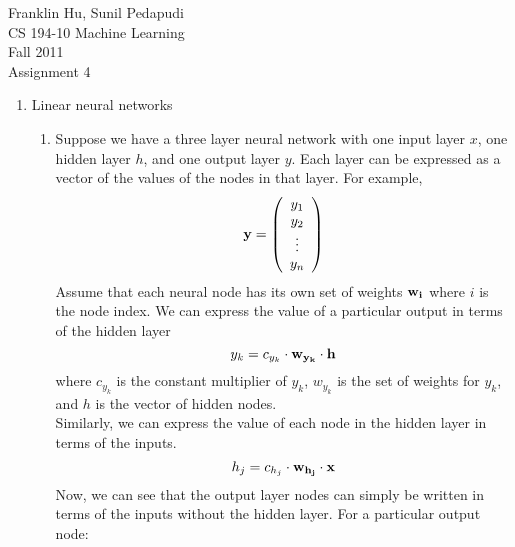 \documentclass{article}
\begin{document}
Franklin Hu, Sunil Pedapudi \\
CS 194-10 Machine Learning \\
Fall 2011 \\
Assignment 4 \\

\begin{enumerate}
    \item Linear neural networks %
        \begin{enumerate}
            \item %
                Suppose we have a three layer neural network with one input
                layer \(x\), one hidden layer \(h\), and one output layer 
                \(y\). Each layer can be expressed as a vector of the 
                values of the nodes in that layer. For example,
                \begin{equation}
                    \bf{y}= \left( \begin{array}{c}
                    y_1 \\
                    y_2 \\
                    \vdots \\
                    y_n \end{array} \right)
                \end{equation}
                Assume that each neural node has its own set of weights 
                \(\bf{w_i}\) where \(i\) is the node index. We can express 
                the value of a particular output in terms of the hidden 
                layer
                \begin{equation}
                    y_k= c_{y_k} \cdot \bf{w_{y_k}} \cdot \bf{h}
                \end{equation}
                where \(c_{y_k}\) is the constant multiplier of \(y_k\),
                \(w_{y_k}\) is the set of weights for \(y_k\), and \(h\)
                is the vector of hidden nodes. \\
                Similarly, we can express the value of each node in the 
                hidden layer in terms of the inputs.
                \begin{equation}
                    h_j= c_{h_j} \cdot \bf{w_{h_j}} \cdot \bf{x}
                \end{equation}
                Now, we can see that the output layer nodes can simply be 
                written in terms of the inputs without the hidden layer.
                For a particular output node:
                \begin{align*}

\end{align*}
\end{enumerate}
\end{enumerate}
\end{document}
